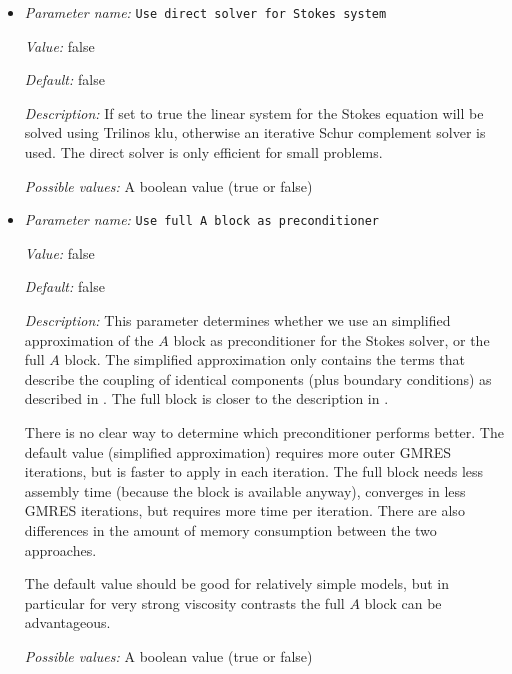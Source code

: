 \begin{itemize}
{\it Value:} block geometric multigrid


{\it Default:} block AMG


{\it Possible values:} Any one of block AMG, direct solver, block geometric multigrid
\item {\it Parameter name:} {\tt Use direct solver for Stokes system}
\label{parameters:Solver parameters/Stokes solver parameters/Use direct solver for Stokes system}
\label{parameters:Solver_20parameters/Stokes_20solver_20parameters/Use_20direct_20solver_20for_20Stokes_20system}


{\it Value:} false


{\it Default:} false


{\it Description:} If set to true the linear system for the Stokes equation will be solved using Trilinos klu, otherwise an iterative Schur complement solver is used. The direct solver is only efficient for small problems.


{\it Possible values:} A boolean value (true or false)
\item {\it Parameter name:} {\tt Use full A block as preconditioner}
\label{parameters:Solver parameters/Stokes solver parameters/Use full A block as preconditioner}
\label{parameters:Solver_20parameters/Stokes_20solver_20parameters/Use_20full_20A_20block_20as_20preconditioner}


{\it Value:} false


{\it Default:} false


{\it Description:} This parameter determines whether we use an simplified approximation of the $A$ block as preconditioner for the Stokes solver, or the full $A$ block. The simplified approximation only contains the terms that describe the coupling of identical components (plus boundary conditions) as described in \cite{KHB12}. The full block is closer to the description in \cite{rudi2017weighted}.

There is no clear way to determine which preconditioner performs better. The default value (simplified approximation) requires more outer GMRES iterations, but is faster to apply in each iteration. The full block needs less assembly time (because the block is available anyway), converges in less GMRES iterations, but requires more time per iteration. There are also differences in the amount of memory consumption between the two approaches.

The default value should be good for relatively simple models, but in particular for very strong viscosity contrasts the full $A$ block can be advantageous.


{\it Possible values:} A boolean value (true or false)
\end{itemize}

